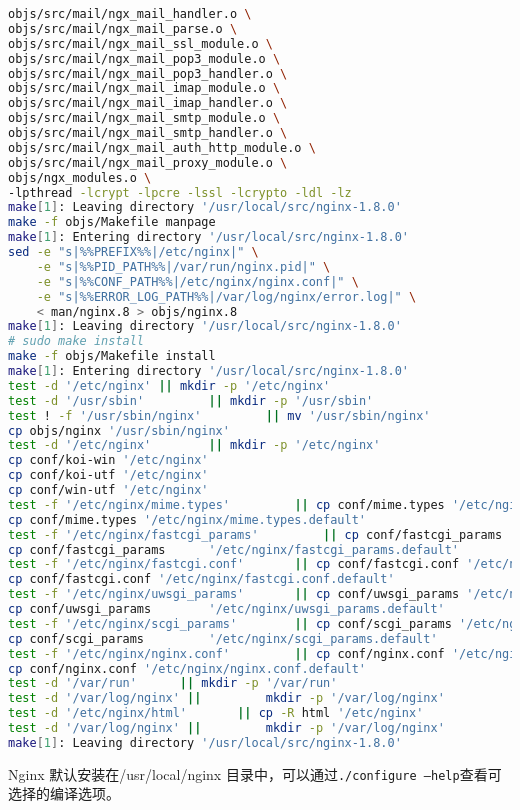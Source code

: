 \begin{lstlisting}[language=bash]
objs/src/mail/ngx_mail_handler.o \
objs/src/mail/ngx_mail_parse.o \
objs/src/mail/ngx_mail_ssl_module.o \
objs/src/mail/ngx_mail_pop3_module.o \
objs/src/mail/ngx_mail_pop3_handler.o \
objs/src/mail/ngx_mail_imap_module.o \
objs/src/mail/ngx_mail_imap_handler.o \
objs/src/mail/ngx_mail_smtp_module.o \
objs/src/mail/ngx_mail_smtp_handler.o \
objs/src/mail/ngx_mail_auth_http_module.o \
objs/src/mail/ngx_mail_proxy_module.o \
objs/ngx_modules.o \
-lpthread -lcrypt -lpcre -lssl -lcrypto -ldl -lz
make[1]: Leaving directory '/usr/local/src/nginx-1.8.0'
make -f objs/Makefile manpage
make[1]: Entering directory '/usr/local/src/nginx-1.8.0'
sed -e "s|%%PREFIX%%|/etc/nginx|" \
	-e "s|%%PID_PATH%%|/var/run/nginx.pid|" \
	-e "s|%%CONF_PATH%%|/etc/nginx/nginx.conf|" \
	-e "s|%%ERROR_LOG_PATH%%|/var/log/nginx/error.log|" \
	< man/nginx.8 > objs/nginx.8
make[1]: Leaving directory '/usr/local/src/nginx-1.8.0'
# sudo make install
make -f objs/Makefile install
make[1]: Entering directory '/usr/local/src/nginx-1.8.0'
test -d '/etc/nginx' || mkdir -p '/etc/nginx'
test -d '/usr/sbin' 		|| mkdir -p '/usr/sbin'
test ! -f '/usr/sbin/nginx' 		|| mv '/usr/sbin/nginx' 			'/usr/sbin/nginx.old'
cp objs/nginx '/usr/sbin/nginx'
test -d '/etc/nginx' 		|| mkdir -p '/etc/nginx'
cp conf/koi-win '/etc/nginx'
cp conf/koi-utf '/etc/nginx'
cp conf/win-utf '/etc/nginx'
test -f '/etc/nginx/mime.types' 		|| cp conf/mime.types '/etc/nginx'
cp conf/mime.types '/etc/nginx/mime.types.default'
test -f '/etc/nginx/fastcgi_params' 		|| cp conf/fastcgi_params '/etc/nginx'
cp conf/fastcgi_params 		'/etc/nginx/fastcgi_params.default'
test -f '/etc/nginx/fastcgi.conf' 		|| cp conf/fastcgi.conf '/etc/nginx'
cp conf/fastcgi.conf '/etc/nginx/fastcgi.conf.default'
test -f '/etc/nginx/uwsgi_params' 		|| cp conf/uwsgi_params '/etc/nginx'
cp conf/uwsgi_params 		'/etc/nginx/uwsgi_params.default'
test -f '/etc/nginx/scgi_params' 		|| cp conf/scgi_params '/etc/nginx'
cp conf/scgi_params 		'/etc/nginx/scgi_params.default'
test -f '/etc/nginx/nginx.conf' 		|| cp conf/nginx.conf '/etc/nginx/nginx.conf'
cp conf/nginx.conf '/etc/nginx/nginx.conf.default'
test -d '/var/run' 		|| mkdir -p '/var/run'
test -d '/var/log/nginx' || 		mkdir -p '/var/log/nginx'
test -d '/etc/nginx/html' 		|| cp -R html '/etc/nginx'
test -d '/var/log/nginx' || 		mkdir -p '/var/log/nginx'
make[1]: Leaving directory '/usr/local/src/nginx-1.8.0'
\end{lstlisting}


Nginx 默认安装在/usr/local/nginx 目录中，可以通过\texttt{./configure --help}查看可选择的编译选项。

